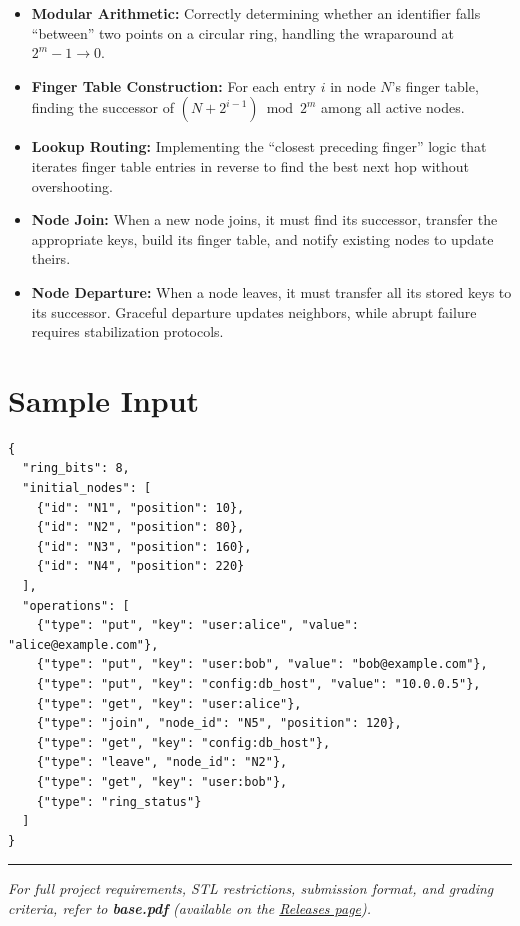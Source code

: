 \begin{itemize}
  \item \textbf{Modular Arithmetic:} Correctly determining whether an identifier falls ``between'' two points on a circular ring, handling the wraparound at $2^m - 1 \to 0$.
  \item \textbf{Finger Table Construction:} For each entry $i$ in node $N$'s finger table, finding the successor of $(N + 2^{i-1}) \bmod 2^m$ among all active nodes.
  \item \textbf{Lookup Routing:} Implementing the ``closest preceding finger'' logic that iterates finger table entries in reverse to find the best next hop without overshooting.
  \item \textbf{Node Join:} When a new node joins, it must find its successor, transfer the appropriate keys, build its finger table, and notify existing nodes to update theirs.
  \item \textbf{Node Departure:} When a node leaves, it must transfer all its stored keys to its successor. Graceful departure updates neighbors, while abrupt failure requires stabilization protocols.
\end{itemize}

\section{Sample Input}

\begin{lstlisting}[style=json, caption={data/input\_sample.json}]
{
  "ring_bits": 8,
  "initial_nodes": [
    {"id": "N1", "position": 10},
    {"id": "N2", "position": 80},
    {"id": "N3", "position": 160},
    {"id": "N4", "position": 220}
  ],
  "operations": [
    {"type": "put", "key": "user:alice", "value": "alice@example.com"},
    {"type": "put", "key": "user:bob", "value": "bob@example.com"},
    {"type": "put", "key": "config:db_host", "value": "10.0.0.5"},
    {"type": "get", "key": "user:alice"},
    {"type": "join", "node_id": "N5", "position": 120},
    {"type": "get", "key": "config:db_host"},
    {"type": "leave", "node_id": "N2"},
    {"type": "get", "key": "user:bob"},
    {"type": "ring_status"}
  ]
}
\end{lstlisting}

\vfill
\noindent\rule{\textwidth}{0.4pt}
{\small\textit{For full project requirements, STL restrictions, submission format, and grading criteria, refer to \textbf{base.pdf} (available on the \href{https://github.com/BestSithInEU/cse211-term-projects/releases}{Releases page}).}}
